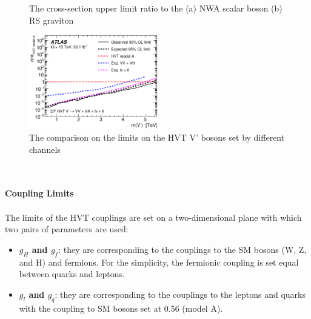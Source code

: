 \begin{figure}[ht]
	\centering
	\caption{The cross-section upper limit ratio to the (a) NWA scalar boson (b) RS graviton}
	\label{Fig:limit_GGF_comb}
\end{figure}
\begin{figure}[ht]
	\centering
    \includegraphics[width=0.5\textwidth]{Chapter4/GGFALLHVTV_compare.eps}
    \caption{The comparison on the limits on the HVT V' bosons set by different channels}
	\label{Fig:limit_GGFHVTV_compare}
\end{figure}
\noindent
\\
\\{\bf Coupling Limits}
\\
\\The limits of the HVT couplings are set on a two-dimensional plane with which two pairs of parameters are used:
\begin{itemize}
  \item[] {\bf $g_{H}$ and $g_{f}$}: they are corresponding to the couplings to the SM bosons (W, Z, and H) and fermions. For the simplicity, the fermionic coupling is set equal between quarks and leptons. 
  \item[] {\bf $g_{l}$ and $g_{q}$}: they are corresponding to the couplings to the leptons and quarks with the coupling to SM bosons set at 0.56 (model A).
\end{itemize}
